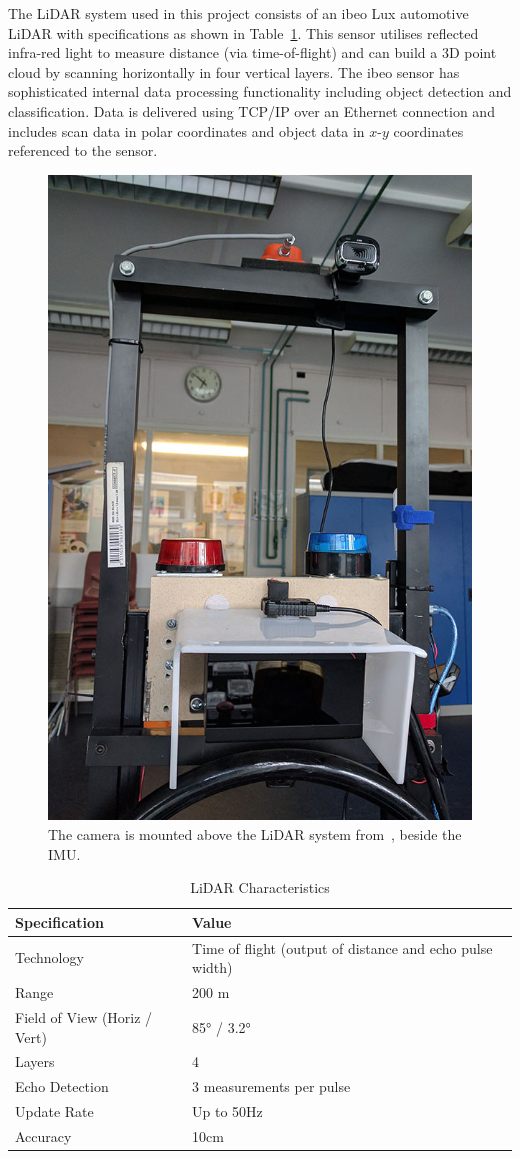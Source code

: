 The LiDAR system used in this project consists of an ibeo Lux automotive LiDAR with specifications as shown in Table~\ref{tablidar}. This sensor utilises reflected infra-red light to measure distance (via time-of-flight) and can build a 3D point cloud by scanning horizontally in four vertical layers. The ibeo sensor has sophisticated internal data processing functionality including object detection and classification. Data is delivered using TCP/IP over an Ethernet connection and includes scan data in polar coordinates and object data in $x$-$y$ coordinates referenced to the sensor.

\begin{figure}[H]
	\centering
	\includegraphics[width=0.35\linewidth]{cammount}
	\caption[Camera mounting location]{The camera is mounted above the LiDAR system from~\cite{drage_lidar_2015}, beside the IMU.}
	\label{fig:5:cam}
\end{figure}

\begin{table}[H]
	\caption{LiDAR Characteristics}
	\label{tablidar}
	\centering
	\begin{tabularx}{0.85\textwidth}{>{\raggedright}p{3cm} X}
		\toprule
		\bfseries Specification & \bfseries Value\\
		\midrule
		Technology & Time of flight (output of distance and echo pulse width)\\
		Range & 200 m\\
		Field of View (Horiz / Vert) & \ang{85} / \ang{3.2}\\
		Layers & 4\\
		Echo Detection & 3 measurements per pulse\\
		Update Rate & Up to 50Hz\\
		Accuracy & 10cm\\
		\bottomrule
	\end{tabularx}
\end{table}

